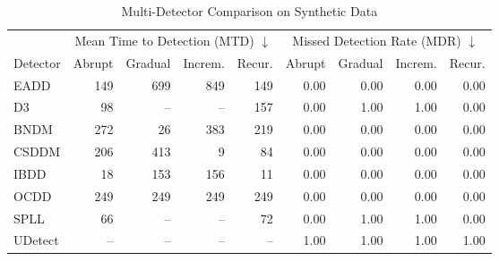 \begin{table}[htbp]
\centering
\caption{Multi-Detector Comparison on Synthetic Data}
\label{tab:exp5_synthetic}
\small
\begin{tabular}{l|rrrr|rrrr}
\hline
& \multicolumn{4}{c|}{Mean Time to Detection (MTD) $\downarrow$} & \multicolumn{4}{c}{Missed Detection Rate (MDR) $\downarrow$} \\
Detector & Abrupt & Gradual & Increm. & Recur. & Abrupt & Gradual & Increm. & Recur. \\
\hline
EADD & 149 & 699 & 849 & 149 & 0.00 & 0.00 & 0.00 & 0.00 \\
D3 & 98 & -- & -- & 157 & 0.00 & 1.00 & 1.00 & 0.00 \\
BNDM & 272 & 26 & 383 & 219 & 0.00 & 0.00 & 0.00 & 0.00 \\
CSDDM & 206 & 413 & 9 & 84 & 0.00 & 0.00 & 0.00 & 0.00 \\
IBDD & 18 & 153 & 156 & 11 & 0.00 & 0.00 & 0.00 & 0.00 \\
OCDD & 249 & 249 & 249 & 249 & 0.00 & 0.00 & 0.00 & 0.00 \\
SPLL & 66 & -- & -- & 72 & 0.00 & 1.00 & 1.00 & 0.00 \\
UDetect & -- & -- & -- & -- & 1.00 & 1.00 & 1.00 & 1.00 \\
\hline
\end{tabular}
\end{table}